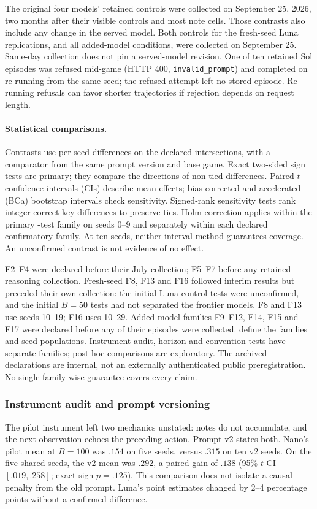 The original four models' retained controls were collected on September 25, 2026, two months after their visible controls and most note cells. Those contrasts also include any change in the served model. Both controls for the fresh-seed Luna replications, and all added-model conditions, were collected on September 25. Same-day collection does not pin a served-model revision. One of ten retained Sol episodes was refused mid-game (HTTP 400, \texttt{invalid\_prompt}) and completed on re-running from the same seed; the refused attempt left no stored episode. Re-running refusals can favor shorter trajectories if rejection depends on request length.

\paragraph{Statistical comparisons.}
Contrasts use per-seed differences on the declared intersections, with a comparator from the same prompt version and base game. Exact two-sided sign tests are primary; they compare the directions of non-tied differences. Paired $t$ confidence intervals (CIs) describe mean effects; bias-corrected and accelerated (BCa) bootstrap intervals check sensitivity. Signed-rank sensitivity tests rank integer correct-key differences to preserve ties. Holm correction applies within the primary \relayprimfamily-test family on seeds 0--9 and separately within each declared confirmatory family. At ten seeds, neither interval method guarantees coverage. An unconfirmed contrast is not evidence of no effect.

F2--F4 were declared before their July collection; F5--F7 before any retained-reasoning collection. Fresh-seed F8, F13 and F16 followed interim results but preceded their own collection: the initial Luna control tests were unconfirmed, and the initial $B{=}50$ tests had not separated the frontier models. F8 and F13 use seeds 10--19; F16 uses 10--29. Added-model families F9--F12, F14, F15 and F17 were declared before any of their episodes were collected.  define the families and seed populations. Instrument-audit, horizon and convention tests have separate families; post-hoc comparisons are exploratory. The archived declarations are internal, not an externally authenticated public preregistration. No single family-wise guarantee covers every claim.

\subsubsection{Instrument audit and prompt versioning}\label{sec:audit}
The pilot instrument left two mechanics unstated: notes do not accumulate, and the next observation echoes the preceding action. Prompt v2 states both. Nano's pilot mean at $B{=}100$ was $.154$ on five seeds, versus $.315$ on ten v2 seeds. On the five shared seeds, the v2 mean was $.292$, a paired gain of $.138$ (95\% $t$ CI $[.019,.258]$; exact sign $p{=}.125$). This comparison does not isolate a causal penalty from the old prompt. Luna's point estimates changed by 2--4 percentage points without a confirmed difference.

